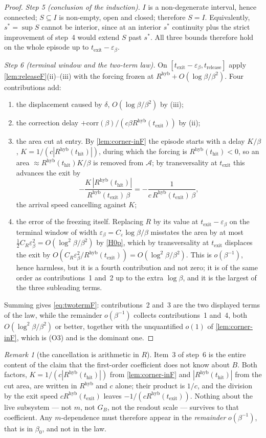 \documentclass[11pt]{article}
\theoremstyle{definition}
\theoremstyle{remark}
\newtheorem{remark}[remark]{Remark}
\newcommand{\thit}{t_{\mathrm{hit}}}
\newcommand{\texit}{t_{\mathrm{exit}}}
\newcommand{\trel}{t_{\mathrm{release}}}
\newcommand{\Ar}{\mathcal{A}}                      %
\newcommand{\hyb}{\mathrm{hyb}}
\begin{document}
\begin{proof}
\emph{Step 5 (conclusion of the induction).} $I$ is a non-degenerate interval,
hence connected; $S\subseteq I$ is non-empty, open and closed; therefore $S=I$.
Equivalently, $s^\ast=\sup S$ cannot be interior, since at an interior $s^\ast$
continuity plus the strict improvement of step~4 would extend $S$ past
$s^\ast$. All three bounds therefore hold on the whole episode up to
$\texit-\varepsilon_\beta$.

\emph{Step 6 (terminal window and the two-term law).} On
$[\texit-\varepsilon_\beta,\trel]$ apply \cref{lem:releaseF}(ii)--(iii) with the
forcing frozen at $R^{\hyb}+O(\log\beta/\beta^2)$. Four contributions add:
\begin{enumerate}
\item the displacement caused by $\delta$, $O(\log\beta/\beta^2)$ by (iii);
\item the correction delay $+\mathrm{corr}(\beta)/(c\beta R^{\hyb}(\texit))$ by
(ii);
\item the area cut at entry. By \cref{lem:corner-inF} the episode starts with a
delay $K/\beta$, $K=1/(c|R^{\hyb}(\thit)|)$, during which the forcing is
$R^{\hyb}(\thit)<0$, so an area $\approx R^{\hyb}(\thit)K/\beta$ is removed from
$\Ar$; by transversality at $\texit$ this advances the exit by
\[
-\frac{K\,|R^{\hyb}(\thit)|}{R^{\hyb}(\texit)\,\beta}
=-\frac{1}{c\,R^{\hyb}(\texit)\,\beta},
\]
the arrival speed cancelling against $K$;
\item the error of the freezing itself. Replacing $R$ by its value at
$\texit-\varepsilon_\beta$ on the terminal window of width
$\varepsilon_\beta=C_\varepsilon\log\beta/\beta$ misstates the area by at most
$\tfrac12C_R\varepsilon_\beta^2=O(\log^2\beta/\beta^2)$ by \eqref{H0p}, which by
transversality at $\texit$ displaces the exit by
$O(C_R\varepsilon_\beta^2/R^{\hyb}(\texit))=O(\log^2\beta/\beta^2)$. This is
$o(\beta^{-1})$, hence harmless, but it is a fourth contribution and not zero;
it is of the same order as contributions~1 and~2 up to the extra $\log\beta$,
and it is the largest of the three subleading terms.
\end{enumerate}
Summing gives \eqref{eq:twotermF}: contributions~2 and~3 are the two displayed
terms of the law, while the remainder $o(\beta^{-1})$ collects contributions~1
and~4, both $O(\log^2\beta/\beta^2)$ or better, together with the unquantified
$o(1)$ of \cref{lem:corner-inF}, which is (O3) and is the dominant one.
\end{proof}

\begin{remark}[the cancellation is arithmetic in $R$]\label{rem:cancelF}
Item~3 of step~6 is the entire content of the claim that the first-order
coefficient does not know about $B$. Both factors, $K=1/(c|R^{\hyb}(\thit)|)$
from \cref{lem:corner-inF} and $|R^{\hyb}(\thit)|$ from the cut area, are
written in $R^{\hyb}$ and $c$ alone; their product is $1/c$, and the division by
the exit speed $cR^{\hyb}(\texit)$ leaves $-1/(cR^{\hyb}(\texit))$. Nothing
about the live subsystem --- not $m$, not $G_B$, not the readout scale ---
survives to that coefficient. Any $m$-dependence must therefore appear in the
\emph{remainder} $o(\beta^{-1})$, that is in $\beta_0$, and not in the law.
\end{remark}
\end{document}

